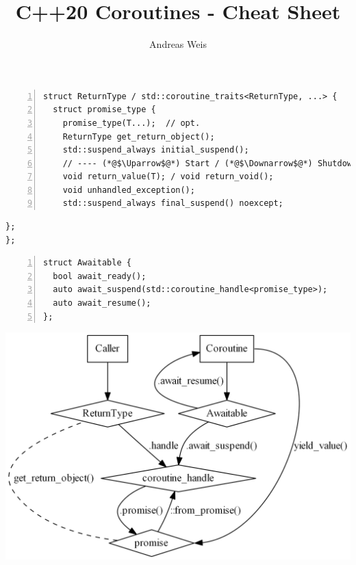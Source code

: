 \documentclass[32pt]{article}
\title{C++20 Coroutines - Cheat Sheet}
\author{Andreas Weis}
\newif\ifnocolors
\begin{document}
  \ifnocolors
  \begin{lstlisting}[style=cpp20,numbers=left]
struct ReturnType / std::coroutine_traits<ReturnType, ...> { 
  struct promise_type {
    promise_type(T...);  // opt.
    ReturnType get_return_object();
    std::suspend_always initial_suspend();
    // ---- (*@$\Uparrow$@*) Start / (*@$\Downarrow$@*) Shutdown ----
    void return_value(T); / void return_void();
    void unhandled_exception();
    std::suspend_always final_suspend() noexcept;
\end{lstlisting}\begin{lstlisting}[style=cpp20]
  };
};
  \end{lstlisting}

  \begin{lstlisting}[style=cpp20,numbers=left]
struct Awaitable {
  bool await_ready();
  auto await_suspend(std::coroutine_handle<promise_type>);
  auto await_resume();
};
\end{lstlisting}

  \includegraphics[height=.5\textheight]{gfx/figure_bw.png}
  
  \else
\end{document}
